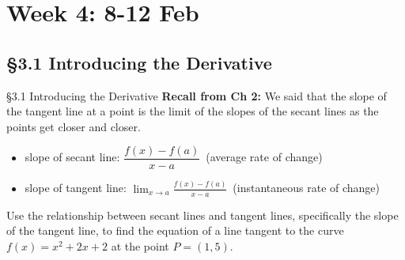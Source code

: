 \documentclass[cal1spr16Lectures.tex]{subfiles}
\begin{document}
\section[Week 4]{Week 4: 8-12 Feb}

\subsection[3.1 Introducing the Derivative]{\S 3.1 Introducing the Derivative}

\begin{frame}{\S 3.1 Introducing the Derivative}{}
{\bf Recall from Ch 2:}  We said that the slope of the tangent line at a point is the limit of the slopes of the secant lines as the points get closer and closer.
\begin{itemize}
\item slope of secant line:  $\dfrac{f(x)-f(a)}{x-a}$\ (average rate of change) 
\item slope of tangent line:  $\lim_{x \to a} \frac{f(x)-f(a)}{x-a}$\ (instantaneous rate of change)
\end{itemize}
\end{frame}

\begin{frame}
\end{frame}

\begin{frame}
\begin{exe} Use the relationship between secant lines and tangent lines, specifically the slope of the tangent line, to find the equation of a line tangent to the curve $f(x)=x^2+2x+2$ at the point $P=(1,5)$.
\end{exe}
\end{frame}
\end{document}
